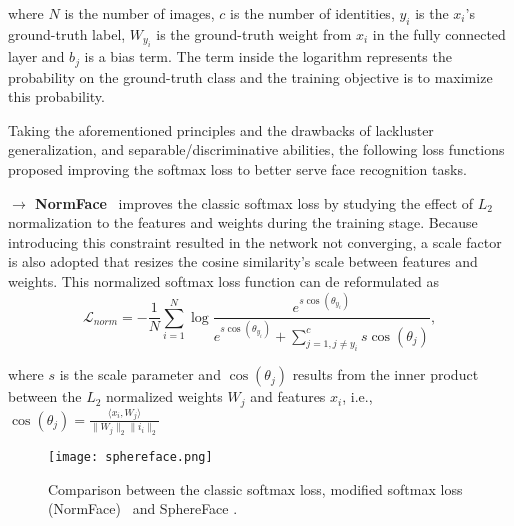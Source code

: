\documentclass[class=report, crop=false, a4paper, 12pt]{standalone}
\begin{document}
\noindent where $N$ is the number of images, $c$ is the number of identities, $y_i$ is the $x_i$'s ground-truth label, $W_{y_i}$ is the ground-truth weight from $x_i$ in the fully connected layer and $b_j$ is a bias term. The term inside the logarithm represents the probability on the ground-truth class and the training objective is to maximize this probability.

\vspace{\baselineskip}
\par Taking the aforementioned principles and the drawbacks of lackluster generalization, and separable/discriminative abilities, the following loss functions proposed improving the softmax loss to better serve face recognition tasks.

\vspace{0.7\baselineskip}
\noindent\textbf{$\rightarrow$ NormFace}~\autocite{wangNormFaceL2Hypersphere2017} improves the classic softmax loss by studying the effect of $L_2$ normalization to the features and weights during the training stage. Because introducing this constraint resulted in the network not converging, a scale factor is also adopted that resizes the cosine similarity's scale between features and weights. This normalized softmax loss function can de reformulated as
\begin{equation}
\mathcal{L}_{norm} = -\frac{1}{N}\sum_{i=1}^{N}\log{\frac{e^{s \cos{(\theta_{y_i})}}}{e^{s \cos{(\theta_{y_i})}}+\sum_{j=1, j\neq y_i}^{c}s \cos{(\theta_{j})}}},
\end{equation}

\noindent where $s$ is the scale parameter and $\cos{(\theta_j)}$ results from the inner product between the $L_2$ normalized  weights $W_j$ and features $x_i$, i.e., $\cos{(\theta_j)}=\frac{\langle x_i, W_j\rangle}{\|W_j\|_2\|i_i\|_2}$

\begin{figure}[!h]
    \centering
    \texttt{[image: sphereface.png]}
    \caption{Comparison between the classic softmax loss, modified softmax loss (NormFace)~\autocite{wangNormFaceL2Hypersphere2017} and SphereFace \autocite{liuSphereFaceDeepHypersphere2018}.}
    \label{fig:sphereface}
\end{figure}
\end{document}
